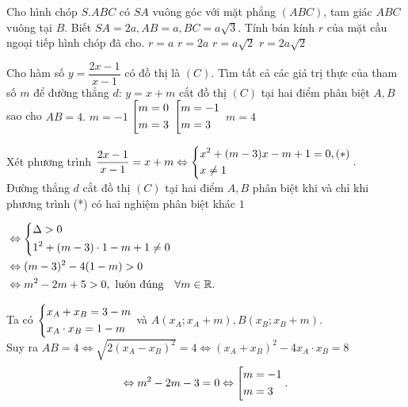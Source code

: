 \begin{ex}%
Cho hình chóp $S.ABC$ có $SA$ vuông góc với mặt phẳng $(ABC)$, tam giác $ABC$ vuông tại $B$. Biết $SA=2a, AB=a, BC =a\sqrt{3}$. Tính bán kính $r$ của mặt cầu ngoại tiếp hình chóp đã cho.
\choice
{$r=a$}
{$r=2a$}
{\True $r=a \sqrt{2}$}
{$r=2a\sqrt{2}$}
\loigiai
{
{}	
}
\end{ex}
\begin{ex}%
Cho hàm số $y= \dfrac{2x-1}{x-1}$ có đồ thị là $(C).$ Tìm tất cả các giá trị thực của tham số $m$ để đường thẳng $d$: $y=x+m$ cắt đồ thị $(C)$ tại hai điểm phân biệt $A, B$ sao cho $AB=4.$
\choice
{$m=-1$}
{$ \left[\begin{aligned}&m=0\\&m=3\end{aligned}\right.$}
{\True $ \left[\begin{aligned}& m=-1\\& m=3\end{aligned}\right.$}
{$m=4$}
\loigiai
{ Xét phương trình $\dfrac{2x-1}{x-1} =x+m \Leftrightarrow \left\{\begin{aligned}& x^2+(m-3)x-m+1=0, (*) \\& x\neq 1\end{aligned}\right..$\\
Đường thẳng $d$ cắt đồ thị $(C)$ tại hai điểm $A, B$ phân biệt khi và chỉ khi phương trình (*) có hai nghiệm phân biệt khác $1$
\begin{center}
$\begin{aligned}
&\Leftrightarrow \left\{\begin{aligned}& \Delta >0\\& 1^2+(m-3)\cdot 1 -m+1 \neq 0\end{aligned}\right.\\ &\Leftrightarrow (m-3)^2-4(1-m)>0 \\ &\Leftrightarrow m^2 -2m +5 >0, \text{ luôn đúng} \quad \forall m \in \mathbb{R}.
\end{aligned}$
\end{center}
Ta có $\left\{\begin{aligned}& x_A+x_B=3-m\\&x_A\cdot x_B=1-m\end{aligned}\right.$ và $A(x_A; x_A+m), B(x_B;x_B+m)$.\\
Suy ra $AB=4 \Leftrightarrow \sqrt{2(x_A-x_B)^2}=4 \Leftrightarrow (x_A+x_B)^2 -4x_A\cdot x_B =8$\\$$ \Leftrightarrow m^2-2m-3=0 \Leftrightarrow \left[\begin{aligned}&m=-1\\&m=3\end{aligned}\right..$$
}
\end{ex}
